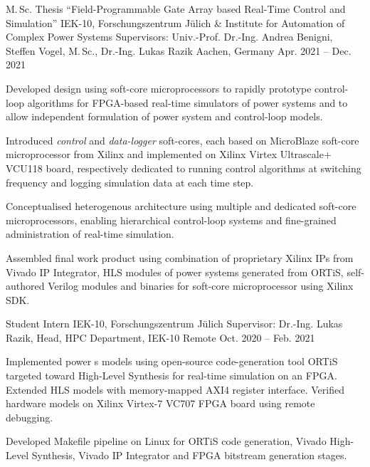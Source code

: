 
\begin{cvexperience}

\cvposition
	{M.\,Sc. Thesis ``Field-Programmable Gate Array based Real-Time Control and Simulation''} %
	{IEK-10, Forschungszentrum J\"ulich \& Institute for Automation of Complex Power Systems} %
	{Supervisors: Univ.-Prof. Dr.-Ing. Andrea Benigni, Steffen Vogel, M.\,Sc., Dr.-Ing. Lukas Razik} %
	{Aachen, Germany  {\acvHeaderIconSep{}} {} } %
	{Apr. 2021 -- Dec. 2021  {\acvHeaderIconSep{}} {} } %
	{\begin{cvitems}
		\item {Developed design using soft-core microprocessors to rapidly prototype control-loop algorithms for FPGA-based real-time simulators of power systems and to allow independent formulation of power system and control-loop models.}
		\item {Introduced \textit{control} and \textit{data-logger} soft-cores, each based on MicroBlaze soft-core microprocessor from Xilinx and implemented on Xilinx Virtex Ultrascale+ VCU118 board, respectively dedicated to running control algorithms at switching frequency and logging simulation data at each time step.} 
		\item {Conceptualised heterogenous architecture using multiple and dedicated soft-core microprocessors, enabling hierarchical control-loop systems and fine-grained administration of real-time simulation.}
  		\item {Assembled final work product using combination of proprietary Xilinx IPs from Vivado IP Integrator, HLS modules of power systems generated from ORTiS, self-authored Verilog modules and binaries for soft-core microprocessor using Xilinx SDK.}
	\end{cvitems}}

\cvposition
	{Student Intern} %
	{IEK-10, Forschungszentrum J\"ulich} %
	{Supervisor: Dr.-Ing. Lukas Razik, Head, HPC Department, IEK-10} %
	{Remote  {\acvHeaderIconSep{}} {} } %
	{Oct. 2020 -- Feb. 2021  {\acvHeaderIconSep{}} {} } %
	{\begin{cvitems}
		\item {Implemented power s models using open-source code-generation tool ORTiS targeted toward High-Level Synthesis for real-time simulation on an FPGA. Extended HLS models with memory-mapped AXI4 register interface. Verified hardware models on Xilinx Virtex-7 VC707 FPGA board using remote debugging.}
  		\item {Developed Makefile pipeline on Linux for ORTiS code generation, Vivado High-Level Synthesis, Vivado IP Integrator and FPGA bitstream generation stages.}
	\end{cvitems}}


\end{cvexperience}
